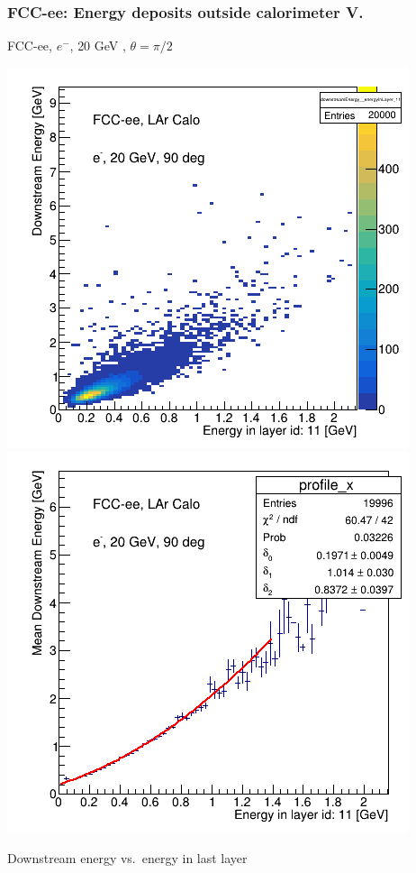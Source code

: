 \documentclass{beamer}
\newcommand{\redtext}[1]{%
  \textcolor{myRed}{#1}
}
\begin{document}
\begin{frame}
  \frametitle{FCC-ee: Energy deposits outside calorimeter V.}

  \centering
  FCC-ee, $e^{-}$, \redtext{20 GeV}, $\theta = \pi/2$ \\[1.5ex]
  \begin{adjustwidth}{-9mm}{-9mm}
    \includegraphics[width=0.49\linewidth]{figures/12layers/hist_downstream_vs_layer_11_90deg_20GeV.png}
    \includegraphics[width=0.49\linewidth]{figures/12layers/profile_downstream_vs_layer_11_90deg_20GeV.png}
  \end{adjustwidth}
  \redtext{Downstream} energy vs.\ energy in last layer
\end{frame}
\end{document}
